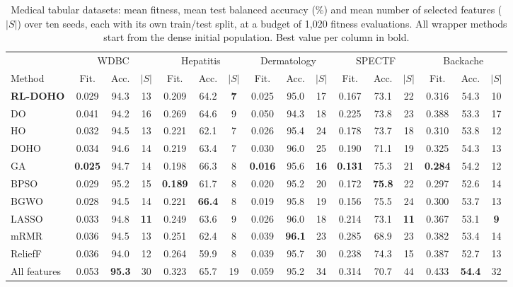 \documentclass[pdflatex,sn-basic]{sn-jnl}
\begin{document}
\begin{table}[t]
\centering
\caption{Medical tabular datasets: mean fitness, mean test balanced accuracy (\%) and mean number of selected features ($|S|$) over ten seeds, each with its own train/test split, at a budget of 1,020 fitness evaluations. All wrapper methods start from the dense initial population. Best value per column in bold.}
\label{tab:tab}
\footnotesize
\setlength{\tabcolsep}{3.2pt}
\begin{tabular}{@{}l ccc ccc ccc ccc ccc@{}}
\toprule
& \multicolumn{3}{c}{WDBC} & \multicolumn{3}{c}{Hepatitis} & \multicolumn{3}{c}{Dermatology} & \multicolumn{3}{c}{SPECTF} & \multicolumn{3}{c}{Backache} \\
\cmidrule(lr){2-4}\cmidrule(lr){5-7}\cmidrule(lr){8-10}\cmidrule(lr){11-13}\cmidrule(l){14-16}
Method & Fit. & Acc. & $|S|$ & Fit. & Acc. & $|S|$ & Fit. & Acc. & $|S|$ & Fit. & Acc. & $|S|$ & Fit. & Acc. & $|S|$ \\
\midrule
\textbf{RL-DOHO} & 0.029 & 94.3 & 13 & 0.209 & 64.2 & \textbf{7} & 0.025 & 95.0 & 17 & 0.167 & 73.1 & 22 & 0.316 & 54.3 & 10 \\
DO & 0.041 & 94.2 & 16 & 0.269 & 64.6 & 9 & 0.050 & 94.3 & 18 & 0.225 & 73.8 & 23 & 0.388 & 53.3 & 17 \\
HO & 0.032 & 94.5 & 13 & 0.221 & 62.1 & 7 & 0.026 & 95.4 & 24 & 0.178 & 73.7 & 18 & 0.310 & 53.8 & 12 \\
DOHO & 0.034 & 94.6 & 14 & 0.219 & 63.4 & 7 & 0.030 & 96.0 & 25 & 0.190 & 71.1 & 19 & 0.325 & 54.3 & 13 \\
\midrule
GA & \textbf{0.025} & 94.7 & 14 & 0.198 & 66.3 & 8 & \textbf{0.016} & 95.6 & \textbf{16} & \textbf{0.131} & 75.3 & 21 & \textbf{0.284} & 54.2 & 12 \\
BPSO & 0.029 & 95.2 & 15 & \textbf{0.189} & 61.7 & 8 & 0.020 & 95.2 & 20 & 0.172 & \textbf{75.8} & 22 & 0.297 & 52.6 & 14 \\
BGWO & 0.028 & 94.5 & 14 & 0.221 & \textbf{66.4} & 8 & 0.019 & 95.8 & 19 & 0.156 & 75.5 & 24 & 0.300 & 53.7 & 13 \\
\midrule
LASSO & 0.033 & 94.8 & \textbf{11} & 0.249 & 63.6 & 9 & 0.026 & 96.0 & 18 & 0.214 & 73.1 & \textbf{11} & 0.367 & 53.1 & \textbf{9} \\
mRMR & 0.036 & 94.5 & 13 & 0.251 & 62.4 & 8 & 0.039 & \textbf{96.1} & 23 & 0.285 & 68.9 & 23 & 0.382 & 53.4 & 14 \\
ReliefF & 0.036 & 94.0 & 12 & 0.264 & 59.9 & 8 & 0.039 & 95.7 & 30 & 0.238 & 74.3 & 15 & 0.387 & 52.7 & 13 \\
All features & 0.053 & \textbf{95.3} & 30 & 0.323 & 65.7 & 19 & 0.059 & 95.2 & 34 & 0.314 & 70.7 & 44 & 0.433 & \textbf{54.4} & 32 \\
\bottomrule
\end{tabular}
\end{table}
\end{document}

